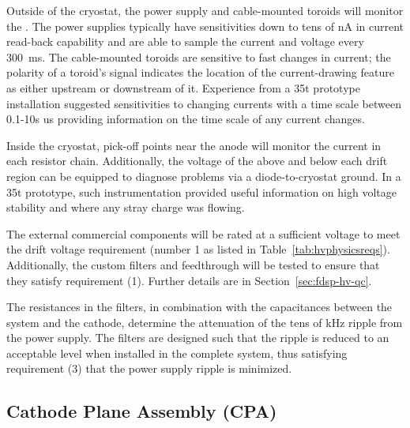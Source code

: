Outside of the cryostat, the power supply and cable-mounted toroids will monitor the .    The power supplies %
typically have sensitivities down to tens of \si{\nano\ampere} in current read-back capability 
 and are able to sample the current and voltage every \SI{300}{\ms}.  The cable-mounted toroids are sensitive to fast changes in current; %
the polarity of a toroid's signal %
indicates the location of the current-drawing feature as either upstream or downstream of it.  Experience from a 35t prototype installation suggested sensitivities to changing currents with a time scale between 0.1-10s us providing information on the time scale of any current changes.

Inside the cryostat, pick-off points near the anode will monitor the current %
in each resistor chain.  Additionally, the voltage of the  above and below each drift region can be equipped to diagnose problems via a diode-to-cryostat ground.  In a 35t prototype, such instrumentation provided useful information on high voltage stability and where any stray charge was flowing.

The external commercial  components will be rated at a sufficient voltage to meet the drift voltage requirement (number 1 as listed in Table~\ref{tab:hvphysicsreqs}).  Additionally, the custom filters and feedthrough will be tested to %
ensure that they satisfy requirement (1).  Further details are in Section~\ref{sec:fdsp-hv-qc}.

The resistances in the filters, in combination with the capacitances between the  system and the cathode,
 determine the attenuation of the tens of \si{\kilo\hertz} ripple from the power supply.  The filters %
are designed such that the ripple is reduced to an acceptable level when installed in the complete system, thus satisfying requirement (3) that the power supply ripple is minimized.

\subsection{Cathode Plane Assembly (CPA)}

